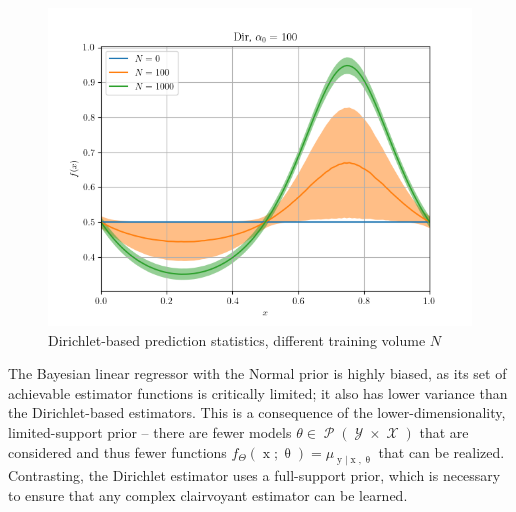 \documentclass[12pt]{report}
\DeclareMathOperator{\xrm}{\mathrm{x}}
\DeclareMathOperator{\yrm}{\mathrm{y}}
\DeclareMathOperator{\Xcal}{\mathcal{X}}
\DeclareMathOperator{\Ycal}{\mathcal{Y}}
\DeclareMathOperator{\Pcal}{\mathcal{P}}
\begin{document}
\begin{figure}
\centering
\includegraphics[width=0.8\linewidth]{SSP_2021/Predict_SE_biased_hard_N.png}
\caption{Dirichlet-based prediction statistics, different training volume $N$}
\label{fig:SSP_2021/Predict_SE_biased_hard_N}
\end{figure}

The Bayesian linear regressor with the Normal prior is highly biased, as its set of achievable estimator functions is critically limited; it also has lower variance than the Dirichlet-based estimators. This is a consequence of the lower-dimensionality, limited-support prior -- there are fewer models $\theta \in \Pcal(\Ycal \times \Xcal)$ that are considered and thus fewer functions $f_{\Theta}(\xrm;\uptheta) = \mu_{\yrm | \xrm,\uptheta}$ that can be realized. Contrasting, the Dirichlet estimator uses a full-support prior, which is necessary to ensure that any complex clairvoyant estimator can be learned.
\end{document}
